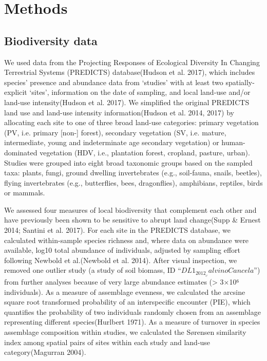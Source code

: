 \section{Methods}
\subsection{Biodiversity data} 
We used data from the Projecting Responses of Ecological Diversity In Changing Terrestrial Systems (PREDICTS) database(Hudson et al. 2017), which includes species’ presence and abundance data from ‘studies’ with at least two spatially-explicit ‘sites’, information on the date of sampling, and local land-use and/or land-use intensity(Hudson et al. 2017). We simplified the original PREDICTS land use and land-use intensity information(Hudson et al. 2014, 2017) by allocating each site to one of three broad land-use categories: primary vegetation (PV, i.e. primary [non-] forest), secondary vegetation (SV, i.e. mature, intermediate, young and indeterminate age secondary vegetation) or human-dominated vegetation (HDV, i.e., plantation forest, cropland, pasture, urban). Studies were grouped into eight broad taxonomic groups based on the sampled taxa: plants, fungi, ground dwelling invertebrates (e.g., soil-fauna, snails, beetles), flying invertebrates (e.g., butterflies, bees, dragonflies), amphibians, reptiles, birds or mammals. 

We assessed four measures of local biodiversity that complement each other and have previously been shown to be sensitive to abrupt land change(Supp & Ernest 2014; Santini et al. 2017). For each site in the PREDICTS database, we calculated within-sample species richness and, where data on abundance were available, log10 total abundance of individuals, adjusted by sampling effort following Newbold et al.(Newbold et al. 2014). After visual inspection, we removed one outlier study (a study of soil biomass, ID $“DL1_2012__CalvinoCancela”$) from further analyses because of very large abundance estimates (> 3×10⁶ individuals). As a measure of assemblage evenness, we calculated the arcsine square root transformed probability of an interspecific encounter (PIE), which quantifies the probability of two individuals randomly chosen from an assemblage representing different species(Hurlbert 1971). As a measure of turnover in species assemblage composition within studies, we calculated the Sørensen similarity index among spatial pairs of sites within each study and land-use category(Magurran 2004).

